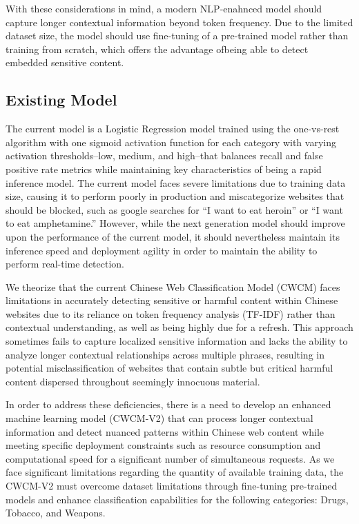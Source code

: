 \documentclass[
  titlepage]{article}
\begin{document}
With these considerations in mind, a modern NLP-enahnced model should
capture longer contextual information beyond token frequency. Due to the
limited dataset size, the model should use fine-tuning of a pre-trained
model rather than training from scratch, which offers the advantage
ofbeing able to detect embedded sensitive content.

\subsection{Existing Model}\label{existing-model}

The current model is a Logistic Regression model trained using the
one-vs-rest algorithm with one sigmoid activation function for each
category with varying activation thresholds--low, medium, and high--that
balances recall and false positive rate metrics while maintaining key
characteristics of being a rapid inference model. The current model
faces severe limitations due to training data size, causing it to
perform poorly in production and miscategorize websites that should be
blocked, such as google searches for ``I want to eat heroin'' or ``I
want to eat amphetamine.'' However, while the next generation model
should improve upon the performance of the current model, it should
nevertheless maintain its inference speed and deployment agility in
order to maintain the ability to perform real-time detection.

We theorize that the current Chinese Web Classification Model (CWCM)
faces limitations in accurately detecting sensitive or harmful content
within Chinese websites due to its reliance on token frequency analysis
(TF-IDF) rather than contextual understanding, as well as being highly
due for a refresh. This approach sometimes fails to capture localized
sensitive information and lacks the ability to analyze longer contextual
relationships across multiple phrases, resulting in potential
misclassification of websites that contain subtle but critical harmful
content dispersed throughout seemingly innocuous material.

In order to address these deficiencies, there is a need to develop an
enhanced machine learning model (CWCM-V2) that can process longer
contextual information and detect nuanced patterns within Chinese web
content while meeting specific deployment constraints such as resource
consumption and computational speed for a significant number of
simultaneous requests. As we face significant limitations regarding the
quantity of available training data, the CWCM-V2 must overcome dataset
limitations through fine-tuning pre-trained models and enhance
classification capabilities for the following categories: Drugs,
Tobacco, and Weapons.
\end{document}
